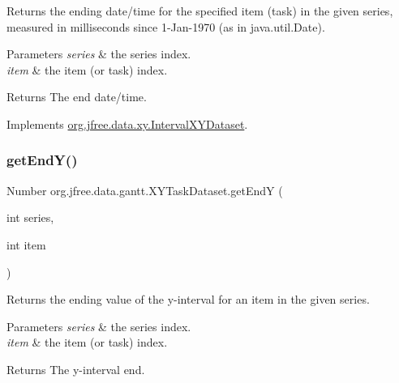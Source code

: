 Returns the ending date/time for the specified item (task) in the given series, measured in milliseconds since 1-\/\+Jan-\/1970 (as in java.\+util.\+Date).


\begin{DoxyParams}{Parameters}
{\em series} & the series index. \\
\hline
{\em item} & the item (or task) index.\\
\hline
\end{DoxyParams}
\begin{DoxyReturn}{Returns}
The end date/time. 
\end{DoxyReturn}


Implements \mbox{\hyperlink{interfaceorg_1_1jfree_1_1data_1_1xy_1_1_interval_x_y_dataset_ad976e66caa1fc4d72a599f2c26c55dcc}{org.\+jfree.\+data.\+xy.\+Interval\+X\+Y\+Dataset}}.

\mbox{\label{classorg_1_1jfree_1_1data_1_1gantt_1_1_x_y_task_dataset_a615ce13ed04f817b4b816cd9915b024e}} 
\subsubsection{\texorpdfstring{get\+End\+Y()}{getEndY()}}
{\footnotesize\ttfamily Number org.\+jfree.\+data.\+gantt.\+X\+Y\+Task\+Dataset.\+get\+EndY (\begin{DoxyParamCaption}\item[{int}]{series,  }\item[{int}]{item }\end{DoxyParamCaption})}

Returns the ending value of the y-\/interval for an item in the given series.


\begin{DoxyParams}{Parameters}
{\em series} & the series index. \\
\hline
{\em item} & the item (or task) index.\\
\hline
\end{DoxyParams}
\begin{DoxyReturn}{Returns}
The y-\/interval end. 
\end{DoxyReturn}


